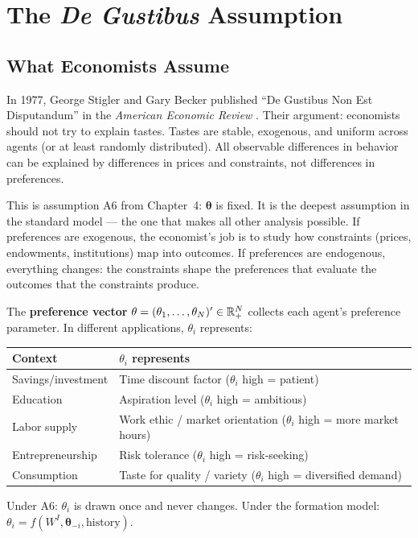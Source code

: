 \documentclass[../structural_economics_book.tex]{subfiles}
\begin{document}
\section{The \textit{De Gustibus} Assumption}
\label{ch09:sec:degustibus}

\subsection{What Economists Assume}

In 1977, George Stigler and Gary Becker published ``De Gustibus Non Est Disputandum'' in the \textit{American Economic Review} \citep{stigler1977gustibus}. Their argument: economists should not try to explain tastes. Tastes are stable, exogenous, and uniform across agents (or at least randomly distributed). All observable differences in behavior can be explained by differences in prices and constraints, not differences in preferences.

This is assumption A6 from Chapter~4: $\boldsymbol{\theta}$ is fixed. It is the deepest assumption in the standard model --- the one that makes all other analysis possible. If preferences are exogenous, the economist's job is to study how constraints (prices, endowments, institutions) map into outcomes. If preferences are endogenous, everything changes: the constraints shape the preferences that evaluate the outcomes that the constraints produce.

\begin{definition}\label{ch09:def:theta}
The \textbf{preference vector} $\theta = (\theta_1, \ldots, \theta_N)' \in \mathbb{R}^N_+$ collects each agent's preference parameter. In different applications, $\theta_i$ represents:
\begin{center}
\begin{tabular}{ll}
\toprule
\textbf{Context} & \textbf{$\theta_i$ represents} \\
\midrule
Savings/investment & Time discount factor ($\theta_i$ high = patient) \\
Education & Aspiration level ($\theta_i$ high = ambitious) \\
Labor supply & Work ethic / market orientation ($\theta_i$ high = more market hours) \\
Entrepreneurship & Risk tolerance ($\theta_i$ high = risk-seeking) \\
Consumption & Taste for quality / variety ($\theta_i$ high = diversified demand) \\
\bottomrule
\end{tabular}
\end{center}
Under A6: $\theta_i$ is drawn once and never changes. Under the formation model: $\theta_i = f(W^I, \boldsymbol{\theta}_{-i}, \text{history})$.
\end{definition}
\end{document}
